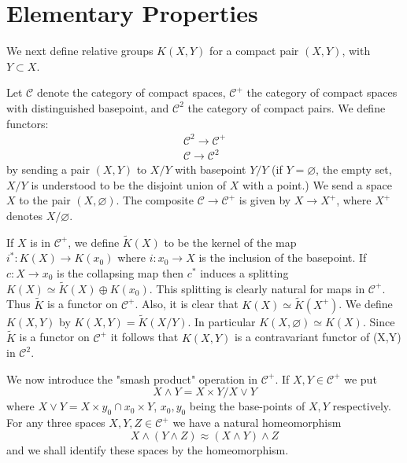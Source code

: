 \documentclass[leqno]{book}
\numberwithin{equation}{section}
\theoremstyle{definition}
\begin{document}
        \section{Elementary Properties}
        
            We next define relative groups $K(X,Y)$ for a compact pair $(X,Y)$, with $Y \subset X$.

            Let $\mathcal{C}$ denote the category of compact spaces, $\mathcal{C}^{+}$ the category of compact spaces with distinguished basepoint, and $\mathcal{C}^{2}$ the category of compact pairs. We define functors:
            \begin{equation*}
              \begin{aligned}
              \mathcal{C}^{2}\to \mathcal{C}^{+} \\
              \mathcal{C}\to \mathcal{C}^{2}
              \end{aligned}
            \end{equation*}
            by sending a pair $(X,Y)$ to $X/Y$ with basepoint $Y/Y$ (if $Y=\varnothing$, the empty set, $X/Y$ is understood to be the disjoint union of $X$ with a point.) We send a space $X$ to the pair $(X,\varnothing)$. The composite $\mathcal{C}\to \mathcal{C}^{+}$ is given by $X\to X^{+}$, where $X^{+}$ denotes $X/\varnothing$.

            If $X$ is in $\mathcal{C}^{+}$, we define $\tilde{K}(X)$ to be the kernel of the map $i^{*}: K(X)\to K(x_{0})$ where $i:x_{0}\to X$ is the inclusion of the basepoint. If $c:X\to x_{0}$ is the collapsing map then $c^{*}$ induces a splitting $K(X)\simeq \tilde{K}(X)\oplus K(x_0)$. This splitting is clearly natural for maps in $\mathcal{C}^{+}$. Thus $\tilde{K}$ is a functor on $\mathcal{C}^{+}$. Also, it is clear that $K(X)\simeq \tilde{K}(X^{+})$. We define $K(X,Y)$ by $K(X,Y)=\tilde{K}(X/Y)$. In particular $K(X,\varnothing)\simeq K(X)$. Since $\tilde K$ is a functor on $\mathcal{C}^{+}$ it follows that $K(X,Y)$ is a contravariant functor of (X,Y) in $\mathcal{C}^{2}$.

            We now introduce the "smash product" operation in $\mathcal{C}^{+}$. If $X,Y\in \mathcal{C}^{+}$ we put 
            \begin{equation*}
              X\wedge Y=X\times Y/X\vee Y
            \end{equation*}
            where $X\vee Y=X\times y_0\cap x_{0}\times Y$, $x_0,y_0$ being the base-points of $X,Y$ respectively. For any three spaces $X,Y,Z \in \mathcal{C}^{+}$ we have a natural homeomorphism
            \begin{equation*}
              X\wedge (Y\wedge Z)\approx (X\wedge Y)\wedge Z
            \end{equation*}
            and we shall identify these spaces by the homeomorphism.
\end{document}
